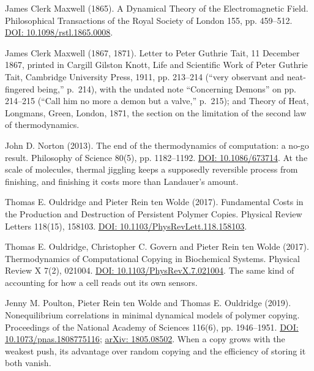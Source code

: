 \documentclass[11pt,twoside]{article}
\theoremstyle{thielethm}
\theoremstyle{thieledef}
\theoremstyle{thieledef}
\theoremstyle{thieledef}
\theoremstyle{thielethm}
\theoremstyle{thieleobs}
\theoremstyle{thielethm}
\begin{document}
\noindent James Clerk Maxwell (1865). A Dynamical Theory of the Electromagnetic Field. Philosophical Transactions of the Royal Society of London 155, pp. 459--512. \href{https://doi.org/10.1098/rstl.1865.0008}{DOI: 10.1098/rstl.1865.0008}.
\par\medskip

\noindent James Clerk Maxwell (1867, 1871). Letter to Peter Guthrie Tait, 11 December 1867, printed in Cargill Gilston Knott, Life and Scientific Work of Peter Guthrie Tait, Cambridge University Press, 1911, pp. 213--214 (``very observant and neat-fingered being,'' p.~214), with the undated note ``Concerning Demons'' on pp. 214--215 (``Call him no more a demon but a valve,'' p.~215); and Theory of Heat, Longmans, Green, London, 1871, the section on the limitation of the second law of thermodynamics.
\par\medskip

\noindent John D. Norton (2013). The end of the thermodynamics of computation: a no-go result. Philosophy of Science 80(5), pp. 1182--1192. \href{https://doi.org/10.1086/673714}{DOI: 10.1086/673714}. At the scale of molecules, thermal jiggling keeps a supposedly reversible process from finishing, and finishing it costs more than Landauer's amount.
\par\medskip

\noindent Thomas E. Ouldridge and Pieter Rein ten Wolde (2017). Fundamental Costs in the Production and Destruction of Persistent Polymer Copies. Physical Review Letters 118(15), 158103. \href{https://doi.org/10.1103/PhysRevLett.118.158103}{DOI: 10.1103/PhysRevLett.118.158103}.
\par\medskip

\noindent Thomas E. Ouldridge, Christopher C. Govern and Pieter Rein ten Wolde (2017). Thermodynamics of Computational Copying in Biochemical Systems. Physical Review X 7(2), 021004. \href{https://doi.org/10.1103/PhysRevX.7.021004}{DOI: 10.1103/PhysRevX.7.021004}. The same kind of accounting for how a cell reads out its own sensors.
\par\medskip

\noindent Jenny M. Poulton, Pieter Rein ten Wolde and Thomas E. Ouldridge (2019). Nonequilibrium correlations in minimal dynamical models of polymer copying. Proceedings of the National Academy of Sciences 116(6), pp. 1946--1951. \href{https://doi.org/10.1073/pnas.1808775116}{DOI: 10.1073/pnas.1808775116}; \href{https://arxiv.org/abs/1805.08502}{arXiv: 1805.08502}. When a copy grows with the weakest push, its advantage over random copying and the efficiency of storing it both vanish.
\par\medskip
\end{document}
